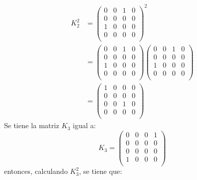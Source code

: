     \begin{align*}
        K_2^2 &=\left( \begin{matrix}
            0 & 0 & 1 & 0 \\
            0 & 0 & 0 & 0 \\
            1 & 0 & 0 & 0 \\
            0 & 0 & 0 & 0 \\
        \end{matrix}\right)^2 \\
        & =\left( \begin{matrix}
            0 & 0 & 1 & 0 \\
            0 & 0 & 0 & 0 \\
            1 & 0 & 0 & 0 \\
            0 & 0 & 0 & 0 \\
        \end{matrix}\right)\left( \begin{matrix}
            0 & 0 & 1 & 0 \\
            0 & 0 & 0 & 0 \\
            1 & 0 & 0 & 0 \\
            0 & 0 & 0 & 0 \\
        \end{matrix}\right)\\
        & =\left( \begin{matrix}
            1 & 0 & 0 & 0 \\
            0 & 0 & 0 & 0 \\
            0 & 0 & 1 & 0 \\
            0 & 0 & 0 & 0 \\
        \end{matrix}\right)
    \end{align*}
    Se tiene la matriz $K_3$ igual a:
    \begin{equation*}
        K_3 =\left( \begin{matrix}
            0 & 0 & 0 & 1 \\
            0 & 0 & 0 & 0 \\
            0 & 0 & 0 & 0 \\
            1 & 0 & 0 & 0 \\
        \end{matrix}\right)
    \end{equation*}
    entonces, calculando $K_3^2$, se tiene que:
